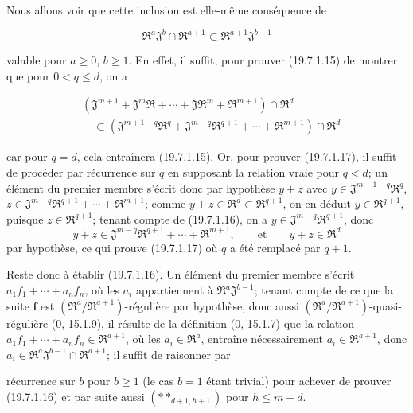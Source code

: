 Nous allons voir que cette inclusion est elle-même conséquence de
\begin{env}[19.7.1.16]
\label{IV.19.7.1.16}
\[
  \mathfrak R^a\mathfrak J^b\cap\mathfrak R^{a+1}\subset\mathfrak R^{a+1}\mathfrak J^{b-1}
\]
\end{env}
valable pour $a\geq0$, $b\geq1$. En effet, il suffit, pour prouver (19.7.1.15) de montrer que pour $0<q\leq d$, on a
\begin{env}[19.7.1.17]
\label{IV.19.7.1.17}
\[
\begin{aligned}
  &(\mathfrak J^{m+1}+\mathfrak J^m\mathfrak R+\cdots+\mathfrak J\mathfrak R^m+\mathfrak R^{m+1})\cap\mathfrak R^d\\
  &\quad\subset(\mathfrak J^{m+1-q}\mathfrak R^q+\mathfrak J^{m-q}\mathfrak R^{q+1}+\cdots+\mathfrak R^{m+1})\cap\mathfrak R^d
\end{aligned}
\]
\end{env}
car pour $q=d$, cela entraînera (19.7.1.15). Or, pour prouver (19.7.1.17), il suffit de procéder par récurrence sur $q$ en supposant la relation vraie pour $q<d$; un élément du premier membre s'écrit donc par hypothèse $y+z$ avec $y\in\mathfrak J^{m+1-q}\mathfrak R^q$, $z\in\mathfrak J^{m-q}\mathfrak R^{q+1}+\cdots+\mathfrak R^{m+1}$; comme $y+z\in\mathfrak R^d\subset\mathfrak R^{q+1}$, on en déduit $y\in\mathfrak R^{q+1}$, puisque $z\in\mathfrak R^{q+1}$; tenant compte de (19.7.1.16), on a $y\in\mathfrak J^{m-q}\mathfrak R^{q+1}$, donc
\[
  y+z\in\mathfrak J^{m-q}\mathfrak R^{q+1}+\cdots+\mathfrak R^{m+1},\qquad\text{et}\qquad y+z\in\mathfrak R^d
\]
par hypothèse, ce qui prouve (19.7.1.17) où $q$ a été remplacé par $q+1$.

Reste donc à établir (19.7.1.16). Un élément du premier membre s'écrit $a_1f_1+\cdots+a_nf_n$, où les $a_i$ appartiennent à $\mathfrak R^a\mathfrak J^{b-1}$; tenant compte de ce que la suite $\mathbf f$ est $(\mathfrak R^a/\mathfrak R^{a+1})$-régulière par hypothèse, donc aussi $(\mathfrak R^a/\mathfrak R^{a+1})$-quasi-régulière ($0$, 15.1.9), il résulte de la définition ($0$, 15.1.7) que la relation $a_1f_1+\cdots+a_nf_n\in\mathfrak R^{a+1}$, où les $a_i\in\mathfrak R^a$, entraîne nécessairement $a_i\in\mathfrak R^{a+1}$, donc $a_i\in\mathfrak R^a\mathfrak J^{b-1}\cap\mathfrak R^{a+1}$; il suffit de raisonner par


récurrence sur $b$ pour $b\geq1$ (le cas $b=1$ étant trivial) pour achever de prouver (19.7.1.16) et par suite aussi $(**_{d+1,h+1})$ pour $h\leq m-d$.


